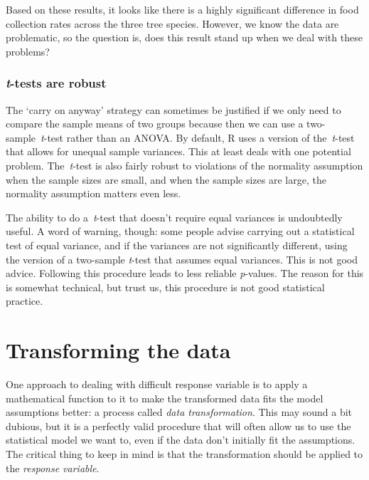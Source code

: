 \documentclass[
]{book}
\newenvironment{greybox}{
  \definecolor{shadecolor}{rgb}{0.95,0.95,0.95}  %
  \color{black}
  \begin{shaded}}
 {\end{shaded}}
\newenvironment{infobox}[1]
  {
  \begin{itemize}
  \renewcommand{\labelitemi}{
    \raisebox{-.7\height}[0pt][0pt]{
      {\setkeys{Gin}{width=3em,keepaspectratio}
        \texttt{[image: images/\#1]}}
    }
  }
  \setlength{\fboxsep}{1em}
  \begin{greybox}
  \item
  }
  {
  \end{greybox}
  \end{itemize}
  }
\begin{document}
Based on these results, it looks like there is a highly significant difference in food collection rates across the three tree species. However, we know the data are problematic, so the question is, does this result stand up when we deal with these problems?

\begin{infobox}{information}

\hypertarget{t-tests-are-robust}{%
\subsubsection*{\texorpdfstring{\emph{t}-tests are robust}{t-tests are robust}}\label{t-tests-are-robust}}

The `carry on anyway' strategy can sometimes be justified if we only need to compare the sample means of two groups because then we can use a two-sample~\emph{t}-test rather than an ANOVA. By default, R uses a version of the~\emph{t}-test that allows for unequal sample variances. This at least deals with one potential problem. The~\emph{t}-test is also fairly robust to violations of the normality assumption when the sample sizes are small, and when the sample sizes are large, the normality assumption matters even less.

The ability to do a~\emph{t}-test that doesn't require equal variances is undoubtedly useful. A word of warning, though: some people advise carrying out a statistical test of equal variance, and if the variances are not significantly different, using the version of a two-sample \emph{t}-test that assumes equal variances. This is not good advice. Following this procedure leads to less reliable \emph{p}-values. The reason for this is somewhat technical, but trust us, this procedure is not good statistical practice.

\end{infobox}

\hypertarget{transform}{%
\section{Transforming the data}\label{transform}}

One approach to dealing with difficult response variable is to apply a mathematical function to it to make the transformed data fits the model assumptions better: a process called \emph{data transformation}. This may sound a bit dubious, but it is a perfectly valid procedure that will often allow us to use the statistical model we want to, even if the data don't initially fit the assumptions. The critical thing to keep in mind is that the transformation should be applied to the \emph{response variable}.
\end{document}
